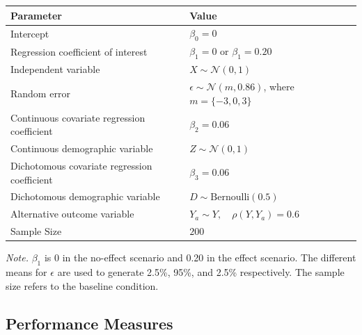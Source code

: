 \documentclass[
  man,
  floatsintext,
  longtable,
  nolmodern,
  notxfonts,
  notimes,
  colorlinks=true,linkcolor=blue,citecolor=blue,urlcolor=blue]{apa7}
\begin{document}
\begin{table}

{\caption{{Parameter Values for the Data-Generating
Mechanism}{\label{tbl-DGM}}}
\vspace{-20pt}}

\begin{longtable}[]{@{}
  >{\raggedright\arraybackslash}p{}
  >{\raggedright\arraybackslash}p{}@{}}
\toprule\noalign{}
\begin{minipage}[b]{\linewidth}\raggedright
Parameter
\end{minipage} & \begin{minipage}[b]{\linewidth}\raggedright
Value
\end{minipage} \\
\midrule\noalign{}
\endhead
\bottomrule\noalign{}
\endlastfoot
Intercept & \(\beta_0 = 0\) \\
Regression coefficient of interest & \(\beta_1 = 0\) or
\(\beta_1 = 0.20\) \\
Independent variable & \(X \sim \mathcal{N}(0, 1)\) \\
Random error & \(\epsilon \sim \mathcal{N}(m, 0.86)\), where
\(m = \{-3, 0, 3\}\) \\
Continuous covariate regression coefficient & \(\beta_2 = 0.06\) \\
Continuous demographic variable & \(Z \sim \mathcal{N}(0, 1)\) \\
Dichotomous covariate regression coefficient & \(\beta_3 = 0.06\) \\
Dichotomous demographic variable & \(D \sim \text{Bernoulli}(0.5)\) \\
Alternative outcome variable &
\(Y_a \sim Y, \quad \rho(Y, Y_a) = 0.6\) \\
Sample Size & \(200\) \\
\end{longtable}

\emph{Note.} \(\beta_1\) is 0 in the no-effect scenario and 0.20 in the
effect scenario. The different means for \(\epsilon\) are used to
generate 2.5\%, 95\%, and 2.5\% respectively. The sample size refers to
the baseline condition.

\end{table}

\subsection{Performance Measures}\label{performance-measures}
\end{document}

